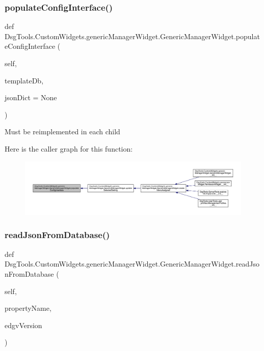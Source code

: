\subsubsection{\texorpdfstring{populate\+Config\+Interface()}{populateConfigInterface()}}
{\footnotesize\ttfamily def Dsg\+Tools.\+Custom\+Widgets.\+generic\+Manager\+Widget.\+Generic\+Manager\+Widget.\+populate\+Config\+Interface (\begin{DoxyParamCaption}\item[{}]{self,  }\item[{}]{template\+Db,  }\item[{}]{json\+Dict = {\ttfamily None} }\end{DoxyParamCaption})}

\begin{DoxyVerb}Must be reimplemented in each child
\end{DoxyVerb}
 Here is the caller graph for this function\+:
\nopagebreak
\begin{figure}[H]
\begin{center}
\leavevmode
\includegraphics[width=350pt]{class_dsg_tools_1_1_custom_widgets_1_1generic_manager_widget_1_1_generic_manager_widget_ab68bb67376c927cd7f951ab2b0a52fd6_icgraph}
\end{center}
\end{figure}
\mbox{\label{class_dsg_tools_1_1_custom_widgets_1_1generic_manager_widget_1_1_generic_manager_widget_a5215d77806621e6e57619d564f43c41b}} 
\subsubsection{\texorpdfstring{read\+Json\+From\+Database()}{readJsonFromDatabase()}}
{\footnotesize\ttfamily def Dsg\+Tools.\+Custom\+Widgets.\+generic\+Manager\+Widget.\+Generic\+Manager\+Widget.\+read\+Json\+From\+Database (\begin{DoxyParamCaption}\item[{}]{self,  }\item[{}]{property\+Name,  }\item[{}]{edgv\+Version }\end{DoxyParamCaption})}

